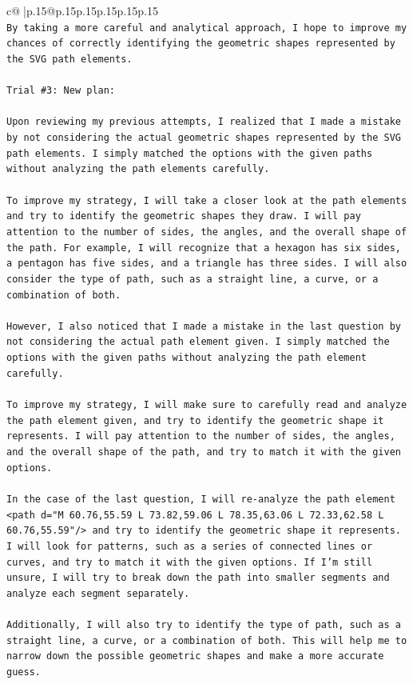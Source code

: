 \documentclass{article}
\begin{document}
{\begin{supertabular}{c@{$\;$}|p{.15\linewidth}@{}p{.15\linewidth}p{.15\linewidth}p{.15\linewidth}p{.15\linewidth}p{.15\linewidth}}
{{{\\ 
\texttt{By taking a more careful and analytical approach, I hope to improve my chances of correctly identifying the geometric shapes represented by the SVG path elements.} \\
\\ 
\texttt{Trial \#3: New plan: } \\
\\ 
\texttt{Upon reviewing my previous attempts, I realized that I made a mistake by not considering the actual geometric shapes represented by the SVG path elements. I simply matched the options with the given paths without analyzing the path elements carefully.} \\
\\ 
\texttt{To improve my strategy, I will take a closer look at the path elements and try to identify the geometric shapes they draw. I will pay attention to the number of sides, the angles, and the overall shape of the path. For example, I will recognize that a hexagon has six sides, a pentagon has five sides, and a triangle has three sides. I will also consider the type of path, such as a straight line, a curve, or a combination of both.} \\
\\ 
\texttt{However, I also noticed that I made a mistake in the last question by not considering the actual path element given. I simply matched the options with the given paths without analyzing the path element carefully. } \\
\\ 
\texttt{To improve my strategy, I will make sure to carefully read and analyze the path element given, and try to identify the geometric shape it represents. I will pay attention to the number of sides, the angles, and the overall shape of the path, and try to match it with the given options.} \\
\\ 
\texttt{In the case of the last question, I will re{-}analyze the path element <path d="M 60.76,55.59 L 73.82,59.06 L 78.35,63.06 L 72.33,62.58 L 60.76,55.59"/> and try to identify the geometric shape it represents. I will look for patterns, such as a series of connected lines or curves, and try to match it with the given options. If I'm still unsure, I will try to break down the path into smaller segments and analyze each segment separately.} \\
\\ 
\texttt{Additionally, I will also try to identify the type of path, such as a straight line, a curve, or a combination of both. This will help me to narrow down the possible geometric shapes and make a more accurate guess.} \\
}}}
\end{supertabular}}
\end{document}

